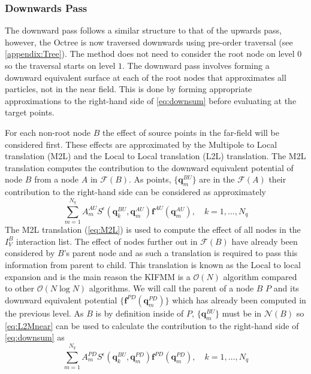 \subsubsection{Downwards Pass}
The downward pass follows a similar structure to that of the upwards pass, however, the Octree is now traversed downwards using pre-order traversal (see \cref{appendix:Tree}). The method does not need to consider the root node on level $0$ so the traversal starts on level $1$. The downward pass involves forming a downward equivalent surface at each of the root nodes that approximates all particles, not in the near field. This is done by forming appropriate approximations to the right-hand side of \cref{eq:downsum} before evaluating at the target points.

For each non-root node $B$ the effect of source points in the far-field will be considered first. These effects are approximated by the Multipole to Local translation (M2L) and the Local to Local translation (L2L) translation. The M2L translation computes the contribution to the downward equivalent potential of node $B$ from a node $A$ in $\mathcal{F}(B)$. As points, $\{\bm{q}^{BU}_m\}$ are in the $\mathcal{F}(A)$ their contribution to the right-hand side can be considered as approximately
\begin{equation}
\label{eq:M2L}
\sum_{m=1}^{N_{q}} A_{m}^{A U} S^\epsilon\left(\bm{q}_{k}^{B U}, \bm{q}_{m}^{A U}\right) \bm{f}^{A U}\left(\bm{q}_{m}^{A U}\right), \quad k=1,\dots,N_q
\end{equation}
The M2L translation (\cref{eq:M2L}) is used to compute the effect of all nodes in the $I_V^B$ interaction list. The effect of nodes further out in $\mathcal{F}(B)$ have already been considered by $B$'s parent node and as such a translation is required to pass this information from parent to child. This translation is known as the Local to local expansion and is the main reason the KIFMM is a $\mathcal{O}(N)$ algorithm compared to other $\mathcal{O}(N\log N)$ algorithms. We will call the parent of a node $B$ $P$ and its downward equivalent potential $\{\bm{f}^{PD}(\bm{q}^{PD}_m)\}$ which has already been computed in the previous level. As $B$ is by definition inside of $P$, $\{\bm{q}^{BU}_m\}$ must be in $\mathcal{N}(B)$ so \cref{eq:L2Mnear} can be used to calculate the contribution to the right-hand side of \cref{eq:downsum} as
\begin{equation}
\label{eq:L2L}
\sum_{m=1}^{N_{q}} A_{m}^{P D} S^\epsilon\left(\bm{q}_{k}^{B U}, \bm{q}_{m}^{P D}\right) \bm{f}^{P D}\left(\bm{q}_{m}^{P D}\right), \quad k=1,\dots,N_q
\end{equation}
